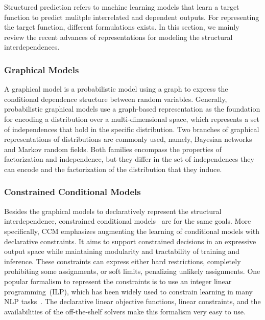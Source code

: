 Structured prediction refers to machine learning models that learn a
target function to predict mulitple interrelated and dependent
outputs. For representing the target function, different formulations
exists. In this section, we mainly review the recent advances of
representations for modeling the structural interdependences.

\subsubsection{Graphical Models}
\label{sssec:bg:graphic-models}
A graphical model is a probabilistic model using a graph to express
the conditional dependence structure between random
variables. Generally, probabilistic graphical models use a graph-based
representation as the foundation for encoding a distribution over a
multi-dimensional space, which represents a set of independences that
hold in the specific distribution. Two branches of graphical
representations of distributions are commonly used, namely, Bayesian
networks and Markov random fields. Both families encompass the
properties of factorization and independence, but they differ in the
set of independences they can encode and the factorization of the
distribution that they induce.

\subsubsection{Constrained Conditional Models}
\label{sssec:bg:ccm}
Besides the graphical models to declaratively represent the structural
interdependence, constrained conditional
models~\citep[CCM,][]{chang2012structured} are for the same
goals. More specifically, CCM emphasizes augmenting the learning of
conditional models with declarative constraints. It aims to support
constrained decisions in an expressive output space while maintaining
modularity and tractability of training and inference. These
constraints can express either hard restrictions, completely
prohibiting some assignments, or soft limits, penalizing unlikely
assignments. One popular formalism to represent the constraints is to
use an integer linear programming~(ILP), which has been widely used to
constrain learning in many NLP tasks~\citep{roth2007global}. The
declarative linear objective functions, linear constraints, and the
availabilities of the off-the-shelf solvers make this formalism very
easy to use.

